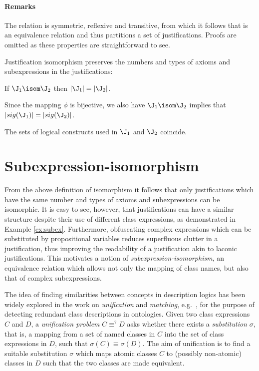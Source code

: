 \paragraph{Remarks}
\begin{compactenum}
\item The relation \isom is symmetric, reflexive and transitive, from which it follows that \isom is an equivalence relation and thus partitions a set of justifications. Proofs are omitted as these properties are straightforward to see.
 \item Justification isomorphism preserves the numbers and types of axioms and subexpressions in the justifications:
\begin{compactenum}
\item If $\J_{1} \isom \J_{2}$ then $\left|\J_{1}\right| = \left|\J_{2}\right|$.
\item Since the mapping $\phi$ is bijective, we also have $\J_{1} \isom \J_{2} $ implies that $\left|sig(\J_{1})\right| = \left|sig(\J_{2})\right|$.
\item The sets of logical constructs used in $\J_{1}$ and $\J_{2}$ coincide.
\end{compactenum}
\end{compactenum}

\section{Subexpression-isomorphism}

From the above definition of isomorphism it follows that only justifications which have the same number and types of axioms and subexpressions can be  isomorphic. It is easy to see, however, that justifications can have a similar structure despite their use of different class expressions, as demonstrated in Example \ref{ex:subex}. Furthermore, obfuscating complex expressions which can be substituted by propositional variables reduces superfluous clutter in a justification, thus improving the readability of a justification akin to laconic justifications. This motivates a notion of \emph{subexpression-isomorphism}, an equivalence relation which allows not only the mapping of class names, but also that of complex subexpressions.

The idea of finding similarities between concepts in description logics has been widely explored in the work on \emph{unification} and \emph{matching}, e.g.\ \cite{baader98yt,baader99ai,baader09je}, for the purpose of detecting redundant class descriptions in ontologies. Given two class expressions $C$ and $D$, a \emph{unification problem} $C \equiv^{?} D$ asks whether there exists a \emph{substitution} $\sigma$, that is, a mapping from a set of named classes in $C$ into the set of class expressions in $D$, such that $\sigma(C) \equiv \sigma(D)$. The aim of unification is to find a suitable substitution $\sigma$ which maps atomic classes $C$ to (possibly non-atomic) classes in $D$ such that the two classes are made equivalent. 

